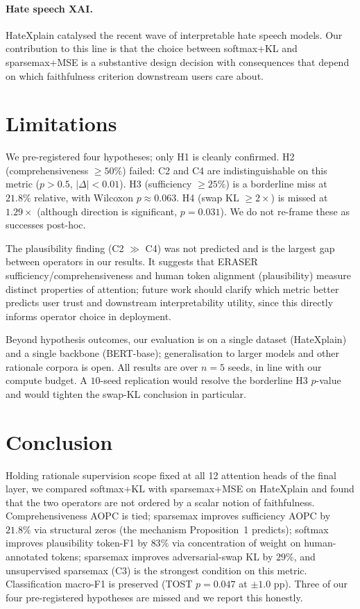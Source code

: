 \documentclass{article}
\begin{document}
\paragraph{Hate speech XAI.}
HateXplain \citep{mathew2021hatexplain} catalysed the recent wave of interpretable hate
speech models. Our contribution to this line is that the choice between softmax+KL and
sparsemax+MSE is a substantive design decision with consequences that depend on which
faithfulness criterion downstream users care about.

\section{Limitations}
\label{sec:limitations}

We pre-registered four hypotheses; only H1 is cleanly confirmed. H2
(comprehensiveness $\geq 50\%$) failed: C2 and C4 are indistinguishable on this metric
($p > 0.5$, $|\Delta|<0.01$). H3 (sufficiency $\geq 25\%$) is a borderline miss at
$21.8\%$ relative, with Wilcoxon $p \approx 0.063$. H4 (swap KL $\geq 2{\times}$) is
missed at $1.29{\times}$ (although direction is significant, $p{=}0.031$). We do not
re-frame these as successes post-hoc.

The plausibility finding (C2 $\gg$ C4) was not predicted and is the largest gap between
operators in our results. It suggests that ERASER sufficiency/comprehensiveness and
human token alignment (plausibility) measure distinct properties of attention; future
work should clarify which metric better predicts user trust and downstream
interpretability utility, since this directly informs operator choice in deployment.

Beyond hypothesis outcomes, our evaluation is on a single dataset (HateXplain) and a
single backbone (BERT-base); generalisation to larger models and other rationale corpora
is open. All results are over $n{=}5$ seeds, in line with our compute budget. A
$10$-seed replication would resolve the borderline H3 $p$-value and would tighten the
swap-KL conclusion in particular.

\section{Conclusion}
\label{sec:conclusion}

Holding rationale supervision scope fixed at all 12 attention heads of the final layer,
we compared softmax+KL with sparsemax+MSE on HateXplain and found that the two
operators are not ordered by a scalar notion of faithfulness. Comprehensiveness AOPC is
tied; sparsemax improves sufficiency AOPC by $21.8\%$ via structural zeros (the
mechanism Proposition~1 predicts); softmax improves plausibility token-F1 by $83\%$ via
concentration of weight on human-annotated tokens; sparsemax improves adversarial-swap
KL by $29\%$, and unsupervised sparsemax (C3) is the strongest condition on this
metric. Classification macro-F1 is preserved (TOST $p{=}0.047$ at $\pm 1.0$ pp). Three
of our four pre-registered hypotheses are missed and we report this honestly.
\end{document}
